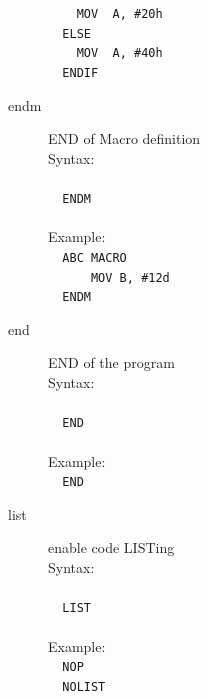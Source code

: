 \documentclass[a4paper,twoside,12pt]{book}
\begin{document}
\begin{description}
				\verb'    '{\color{highlight_instruction}\verb'MOV'}\verb'  '{\color{highlight_sfr}\verb'A'}{\color{highlight_oper_sep}\verb','}\verb' '{\color{highlight_imm_hex}\verb'#20h'}\\
				\verb'  '{\color{highlight_directive}\verb'ELSE'}\\
				\verb'    '{\color{highlight_instruction}\verb'MOV'}\verb'  '{\color{highlight_sfr}\verb'A'}{\color{highlight_oper_sep}\verb','}\verb' '{\color{highlight_imm_hex}\verb'#40h'}\\
				\verb'  '{\color{highlight_directive}\verb'ENDIF'}\\
			\item[endm] END of Macro definition\\
				Syntax:\\\\
				\verb'  '{\color{highlight_directive}\verb'ENDM'}\\
				\verb''\\
				Example:\\
				\verb'  '{\color{highlight_macro}\verb'ABC'}\verb' '{\color{highlight_directive}\verb'MACRO'}\\
				\verb'      '{\color{highlight_instruction}\verb'MOV'}\verb' '{\color{highlight_sfr}\verb'B'}{\color{highlight_oper_sep}\verb','}\verb' '{\color{highlight_imm_dec}\verb'#12d'}\\
				\verb'  '{\color{highlight_directive}\verb'ENDM'}\\
			\item[end] END of the program\\
				Syntax:\\\\
				\verb'  '{\color{highlight_directive}\verb'END'}\\
				\verb''\\
				Example:\\
				\verb'  '{\color{highlight_directive}\verb'END'}\\
			\item[list] enable code LISTing\\
				Syntax:\\\\
				\verb'  '{\color{highlight_directive}\verb'LIST'}\\
				\verb''\\
				Example:\\
				\verb'  '{\color{highlight_instruction}\verb'NOP'}\\
				\verb'  '{\color{highlight_directive}\verb'NOLIST'}\\

\end{description}
\end{document}
